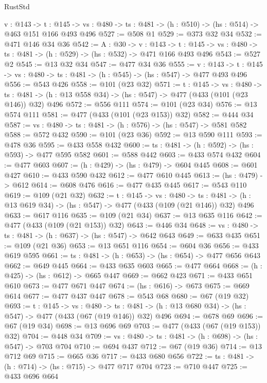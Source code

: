 \begin{lexlean}{RustStd}
\begin{coremodule}
  {v : @143} ->
  {t : @145} -> {vs : @480} -> {ts : @481} -> (h : @510) -> (hs : @514) -> @463 @151 @166 @493 @496
@527 := @508 @1
@529 := @373 @32 @34
@532 := @471 @146 @34 @36
@542 := {A : @30} ->
  {v : @143} ->
  {t : @145} -> {vs : @480} -> {ts : @481} -> (h : @529) -> (hs : @532) -> @471 @166 @493 @496
@543 := @527 @2
@545 := @13 @32 @34
@547 := @477 @34 @36
@555 := {v : @143} ->
  {t : @145} -> {vs : @480} -> {ts : @481} -> (h : @545) -> (hs : @547) -> @477 @493 @496
@556 := @543 @426
@558 := @101 (@23 @32)
@571 := {t : @145} ->
  {vs : @480} ->
  {ts : @481} -> (h : @13 @558 @34) -> (hs : @547) -> @477 (@433 (@101 (@23 @146)) @32) @496
@572 := @556 @111
@574 := @101 (@23 @34)
@576 := @13 @574 @111
@581 := @477 (@433 (@101 (@23 @153)) @32)
@582 := @444 @34
@587 := {vs : @480} -> {ts : @481} -> (h : @576) -> (hs : @547) -> @581 @582
@588 := @572 @432
@590 := @101 (@23 @36)
@592 := @13 @590 @111
@593 := @478 @36
@595 := @433 @558 @432
@600 := {ts : @481} -> (h : @592) -> (hs : @593) -> @477 @595 @582
@601 := @588 @442
@603 := @433 @574 @432
@604 := @477 @603
@607 := (h : @429) -> (hs : @479) -> @604 @445
@608 := @601 @427
@610 := @433 @590 @432
@612 := @477 @610 @445
@613 := (hs : @479) -> @612
@614 := @608 @476
@616 := @477 @435 @445
@617 := @543 @110
@619 := @109 (@21 @32)
@632 := {t : @145} ->
  {vs : @480} ->
  {ts : @481} -> (h : @13 @619 @34) -> (hs : @547) -> @477 (@433 (@109 (@21 @146)) @32) @496
@633 := @617 @116
@635 := @109 (@21 @34)
@637 := @13 @635 @116
@642 := @477 (@433 (@109 (@21 @153)) @32)
@643 := @446 @34
@648 := {vs : @480} -> {ts : @481} -> (h : @637) -> (hs : @547) -> @642 @643
@649 := @633 @435
@651 := @109 (@21 @36)
@653 := @13 @651 @116
@654 := @604 @36
@656 := @433 @619 @595
@661 := {ts : @481} -> (h : @653) -> (hs : @654) -> @477 @656 @643
@662 := @649 @445
@664 := @433 @635 @603
@665 := @477 @664
@668 := (h : @425) -> (hs : @612) -> @665 @447
@669 := @662 @423
@671 := @433 @651 @610
@673 := @477 @671 @447
@674 := (hs : @616) -> @673
@675 := @669 @614
@677 := @477 @437 @447
@678 := @543 @68
@680 := @67 (@19 @32)
@693 := {t : @145} ->
  {vs : @480} ->
  {ts : @481} -> (h : @13 @680 @34) -> (hs : @547) -> @477 (@433 (@67 (@19 @146)) @32) @496
@694 := @678 @69
@696 := @67 (@19 @34)
@698 := @13 @696 @69
@703 := @477 (@433 (@67 (@19 @153)) @32)
@704 := @448 @34
@709 := {vs : @480} -> {ts : @481} -> (h : @698) -> (hs : @547) -> @703 @704
@710 := @694 @437
@712 := @67 (@19 @36)
@714 := @13 @712 @69
@715 := @665 @36
@717 := @433 @680 @656
@722 := {ts : @481} -> (h : @714) -> (hs : @715) -> @477 @717 @704
@723 := @710 @447
@725 := @433 @696 @664

\end{coremodule}
\end{lexlean}
